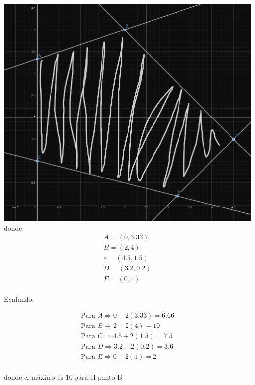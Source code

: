\begin{itemize}
        \includegraphics[scale=0.2]{Ejercicios/Imagenes/Ejercicio1b_1.png}\\
        \newpage
        donde:\\

        \begin{align*}
            A=(0,3.33)\\
            B=(2,4)\\
            c=(4.5,1.5)\\
            D=(3.2, 0.2)\\
            E=(0,1)\\
        \end{align*}
        
        Evalundo:
        
                \begin{align*}
            \mbox{Para } A\Rightarrow 0+2(3.33)=6.66\\
            \mbox{Para } B\Rightarrow 2+2(4)=10\\
            \mbox{Para } C \Rightarrow 4.5+2(1.5)=7.5\\
            \mbox{Para } D \Rightarrow 3.2+2(0.2)=3.6\\
            \mbox{Para } E \Rightarrow 0+2(1)=2\\
        \end{align*}
        
        donde el m\'aximo es $10$ para el punto B
        
    \end{itemize}